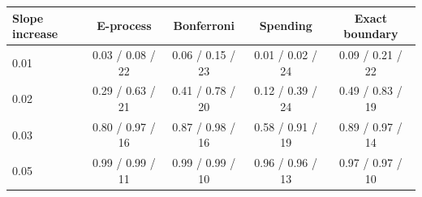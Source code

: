 \begin{tabular}{lcccc}
\toprule
Slope increase & E-process & Bonferroni & Spending & Exact boundary \\
\midrule
0.01 & 0.03 / 0.08 / 22 & 0.06 / 0.15 / 23 & 0.01 / 0.02 / 24 & 0.09 / 0.21 / 22 \\
0.02 & 0.29 / 0.63 / 21 & 0.41 / 0.78 / 20 & 0.12 / 0.39 / 24 & 0.49 / 0.83 / 19 \\
0.03 & 0.80 / 0.97 / 16 & 0.87 / 0.98 / 16 & 0.58 / 0.91 / 19 & 0.89 / 0.97 / 14 \\
0.05 & 0.99 / 0.99 / 11 & 0.99 / 0.99 / 10 & 0.96 / 0.96 / 13 & 0.97 / 0.97 / 10 \\
\bottomrule
\end{tabular}
